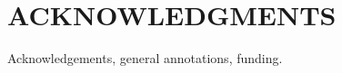 \documentclass{ar-1col}
\begin{document}
 
\section*{ACKNOWLEDGMENTS}
Acknowledgements, general annotations, funding.






\end{document}
